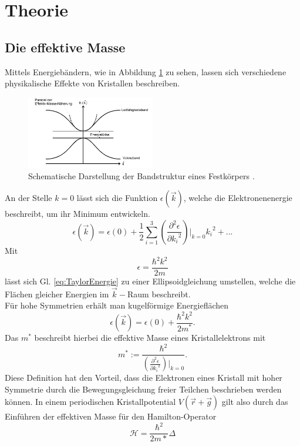 \section{Theorie}
\label{sec:Theorie}
\subsection{Die effektive Masse}
 Mittels Energiebändern, wie in Abbildung \ref{fig:Energiebänder} zu sehen, lassen sich verschiedene physikalische Effekte
 von Kristallen beschreiben.
 \begin{figure}[H]
 \center
 \includegraphics[width=0.5\textwidth]{pics/Energiebaender.jpg}
 \caption{Schematische Darstellung der Bandstruktur eines Festkörpers \cite{Anleitung}.}
 \label{fig:Energiebänder}
 \end{figure}
 An der Stelle $k=0$ lässt sich die Funktion $\epsilon(\vec{k})$, welche die Elektronenenergie beschreibt, um ihr Minimum entwickeln.
 \begin{equation}
   \epsilon(\vec{k})= \epsilon(0)+\frac{1}{2}\sum_{i=1}^3\left(\frac{\partial^2 \epsilon}{\partial{k_i}^2}\right)|_{k=0}{k_i}^2+...
   \label{eq:TaylorEnergie}
 \end{equation}
 Mit
 \begin{equation}
   \epsilon = \frac{\hbar^2 k^2}{2m}
   \label{eq:Epsilonausdruck}
 \end{equation}
 lässt sich Gl. \ref{eq:TaylorEnergie} zu einer Ellipsoidgleichung umstellen,
  welche die Flächen gleicher Energien im $\vec{k}-$Raum beschreibt.\\
  Für hohe Symmetrien erhält man kugelförmige Energieflächen
  \begin{equation}
    \epsilon(\vec{k})= \epsilon(0)+\frac{\hbar^2 k^2}{2m^{*}}.
   \label{eq:KugelEnergie}
  \end{equation}
 Das $m^{*}$ beschreibt hierbei die effektive Masse eines Kristallelektrons mit
 \begin{equation}
   m^{*}:=\frac{\hbar^2}{\left(\frac{\partial^2 \epsilon}{\partial{k_i}^2}\right)|_{k=0}} .
 \end{equation}
 Diese Definition hat den Vorteil, dass die Elektronen eines Kristall mit hoher Symmetrie durch die Bewegungsgleichung
 freier Teilchen beschrieben werden können. In einem periodischen Kristallpotential $V(\vec{r}+\vec{g})$ gilt
  also durch das Einführen der effektiven Masse für den Hamilton-Operator
 \begin{equation}
   \mathcal{H}=\frac{\hbar^2}{2m*}\Delta
   \label{eq:freiHamilton}
 \end{equation}
